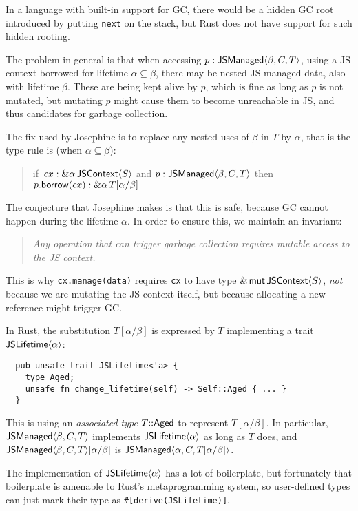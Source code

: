 In a language with built-in support for GC, there would be a hidden
GC root introduced by putting \verb|next| on the stack, but Rust does
not have support for such hidden rooting.

The problem in general is that when accessing $p:\mathsf{JSManaged}\langle \beta,C,T\rangle$,
using a JS context borrowed
for lifetime $\alpha\subseteq\beta$, there may be nested JS-managed
data, also with lifetime $\beta$. These are being kept alive by $p$,
which is fine as long as $p$ is not mutated, but mutating $p$
might cause them to become unreachable in JS, and thus candidates
for garbage collection.

The fix used by Josephine is to replace any nested uses of
$\beta$ in $T$ by $\alpha$, that is the type rule is
(when $\alpha \subseteq \beta$):
\begin{quote}
  if~$cx: \&\alpha\, \mathsf{JSContext}\langle S\rangle$ and $p: \mathsf{JSManaged}\langle \beta,C,T\rangle$
  then $p.\mathsf{borrow}(cx): \&\alpha\, T[\alpha/\beta]$
\end{quote}
The conjecture that Josephine makes is that this is safe, because
GC cannot happen during the lifetime $\alpha$. In order to ensure
this, we maintain an invariant:
\begin{quote}\em
  Any operation that can trigger garbage collection
  requires mutable access to the JS context.
\end{quote}
This is why \verb|cx.manage(data)| requires
\verb|cx| to have type $\&\,\mathsf{mut}\,\mathsf{JSContext}\langle S\rangle$, \emph{not} because
we are mutating the JS context itself, but because allocating
a new reference might trigger GC.

In Rust, the substitution $T[\alpha/\beta]$ is expressed by
$T$ implementing a trait $\mathsf{JSLifetime}\langle \alpha\rangle$:
\begin{verbatim}
  pub unsafe trait JSLifetime<'a> {
    type Aged;
    unsafe fn change_lifetime(self) -> Self::Aged { ... }
  }
\end{verbatim}
This is using an \emph{associated type} $T{::}\mathsf{Aged}$
to represent $T[\alpha/\beta]$.
In particular, $\mathsf{JSManaged}\langle \beta,C,T\rangle$ implements
$\mathsf{JSLifetime}\langle \alpha\rangle$ as long as $T$ does,
and $\mathsf{JSManaged}\langle \beta,C,T\rangle[\alpha/\beta]$ is $\mathsf{JSManaged}\langle \alpha,C,T[\alpha/\beta]\rangle$.

The implementation of $\mathsf{JSLifetime}\langle \alpha\rangle$ has a lot of boilerplate,
but fortunately that boilerplate is amenable to Rust's metaprogramming
system, so user-defined types can just mark their type as
\verb|#[derive(JSLifetime)]|.
